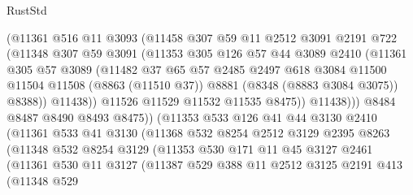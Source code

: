 \begin{lexlean}{RustStd}
\begin{coremodule}
{\begin{coremodule}
{{{{{{{{{{{{{{{{{{{{{{{{{{{{{{{{{{{{{{{{{{{{{{{{{{                  (@11361
                    @516
                    @11
                    @3093
                    (@11458
                      @307
                      @59
                      @11
                      @2512
                      @3091
                      @2191
                      @722
                      (@11348
                        @307
                        @59
                        @3091
                        (@11353
                          @305
                          @126
                          @57
                          @44
                          @3089
                          @2410
                          (@11361
                            @305
                            @57
                            @3089
                            (@11482
                              @37
                              @65
                              @57
                              @2485
                              @2497
                              @618
                              @3084
                              @11500
                              @11504
                              @11508
                              (@8863 (@11510 @37))
                              @8881
                              (@8348 (@8883 @3084 @3075))
                              @8388))
                          @11438))
                      @11526
                      @11529
                      @11532
                      @11535
                      @8475))
                  @11438)))
            @8484
            @8487
            @8490
            @8493
            @8475))
        (@11353
          @533
          @126
          @41
          @44
          @3130
          @2410
          (@11361
            @533
            @41
            @3130
            (@11368
              @532
              @8254
              @2512
              @3129
              @2395
              @8263
              (@11348
                @532
                @8254
                @3129
                (@11353
                  @530
                  @171
                  @11
                  @45
                  @3127
                  @2461
                  (@11361
                    @530
                    @11
                    @3127
                    (@11387
                      @529
                      @388
                      @11
                      @2512
                      @3125
                      @2191
                      @413
                      (@11348
                        @529
}}}}}}}}}}}}}}}}}}}}}}}}}}}}}}}}}}}}}}}}}}}}}}}}}}
\end{coremodule}}
\end{coremodule}
\end{lexlean}
